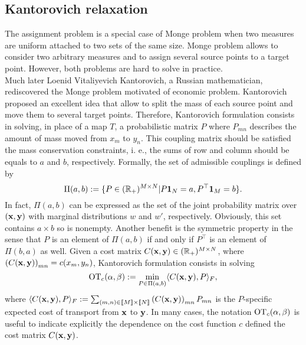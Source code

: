 \subsection{Kantorovich relaxation}
\label{subsec:Kantorovich}
The assignment problem is a special case of Monge problem when two measures are uniform attached to two sets of the same size. Monge problem allows to consider two arbitrary measures and to assign several source points to a target point. However, both problems are hard to solve in practice.\\
Much later Loenid Vitaliyevich Kantorovich, a Russian mathematician, rediscovered the Monge problem motivated of economic problem. Kantorovich~\cite{Kan42} proposed an excellent idea that allow to split the mass of each source point and move them to several target points. Therefore, Kantorovich formulation consists in solving, in place of a map $T$, a probabilistic matrix $P$ where $P_{mn}$ describes the amount of mass moved from $x_m$ to $y_n$. This coupling matrix should be satisfied the mass conservation constraints, i. e., the sums of row and column should be equals to $a$ and $b$, respectively.  Formally, the set of admissible couplings is defined by
\begin{equation*}
\Pi(a, b) := \{ P \in (\mathbb{R}_+)^{M \times N}| P\mathbf{1}_N = a, P^\top \mathbf{1}_M = b  \}.
\end{equation*}
In fact,  $\Pi(a, b)$ can be expressed as the set of the joint probability matrix over $(\textbf{x}, \textbf{y})$ with marginal distributions $w$ and $w'$, respectively. Obviously, this set contains $a \times b$ so is nonempty.  Another benefit  is the symmetric property  in the sense that $P$ is an element of $\Pi(a, b)$ if and only if $P^{\top}$ is an element of  $\Pi(b, a)$ as well. Given a cost matrix $C(\textbf{x}, \textbf{y}) \in (\mathbb{R}_{+})^{M\times N}$, where $\left(C(\textbf{x},\textbf{y})\right)_{mn} = c(x_m, y_n)$, Kantorovich formulation consists in solving
\begin{equation}
\label{chap0:eq:eq1}
\mathrm{OT}_{c}(\alpha, \beta) := \min_{P \in \Pi(a, b)} \langle C(\textbf{x}, \textbf{y}), P \rangle_F,
\end{equation}
where $\langle C(\textbf{x}, \textbf{y}), P \rangle_F := \sum_{(m, n) \in \llbracket M \rrbracket \times \llbracket N \rrbracket} \left(C(\textbf{x}, \textbf{y}) \right)_{mn} P_{mn}$ is the $P$-specific expected cost of transport from $\textbf{x}$ to $\textbf{y}$. In many cases, the notation $\mathrm{OT}_{c}(\alpha, \beta)$ is useful to indicate explicitly the dependence on the cost function $c$  defined the cost matrix $C(\textbf{x},\textbf{y})$.

